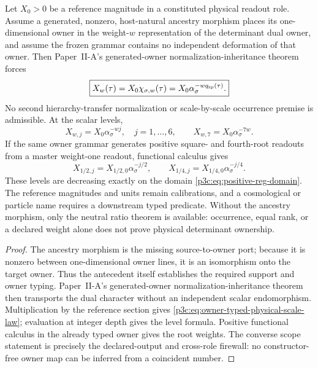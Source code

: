 \documentclass[12pt,a4paper]{article}
\begin{document}
\begin{corollary}
\label{p3c:cor:owner-typed-physical-dual-scale}
Let \(X_0>0\) be a reference magnitude in a constituted physical readout role.
Assume a generated, nonzero, host-natural ancestry morphism places its
one-dimensional owner in the weight-\(w\) representation of the determinant
dual owner, and assume the frozen grammar contains no independent deformation
of that owner.  Then Paper~II-A's generated-owner normalization-inheritance
theorem forces
\begin{equation}
\label{p3c:eq:owner-typed-physical-scale-law}
 \boxed{
 X_w(\tau)
 =X_0\chi_{\sigma,w}(\tau)
 =X_0\alpha_\sigma^{-wq_{\rm sp}(\tau)}.}
\end{equation}
No second hierarchy-transfer normalization or scale-by-scale occurrence
premise is admissible.  At the scalar levels,
\begin{equation}
\label{p3c:eq:owner-typed-physical-scale-levels}
 X_{w,j}=X_0\alpha_\sigma^{-wj},
 \quad j=1,\ldots,6,
 \qquad
 X_{w,7}=X_0\alpha_\sigma^{-7w}.
\end{equation}
If the same owner grammar generates positive square- and fourth-root readouts
from a master weight-one readout, functional calculus gives
\begin{equation}
\label{p3c:eq:root-weight-readouts}
 X_{1/2,j}=X_{1/2,0}\alpha_\sigma^{-j/2},
 \qquad
 X_{1/4,j}=X_{1/4,0}\alpha_\sigma^{-j/4}.
\end{equation}
These levels are decreasing exactly on the domain
\eqref{p3c:eq:positive-reg-domain}.  The reference magnitudes and units remain
calibrations, and a cosmological or particle name requires a downstream typed
predicate.  Without the ancestry morphism, only the neutral ratio theorem is
available: occurrence, equal rank, or a declared weight alone does not prove
physical determinant ownership.
\end{corollary}

\begin{proof}
The ancestry morphism is the missing source-to-owner port; because it is
nonzero between one-dimensional owner lines, it is an isomorphism onto the
target owner.  Thus the antecedent itself establishes the required support and
owner typing.  Paper~II-A's generated-owner normalization-inheritance theorem
then transports the dual character without an independent scalar endomorphism.
Multiplication by the reference section gives
\eqref{p3c:eq:owner-typed-physical-scale-law}; evaluation at integer depth
gives the level formula.  Positive functional calculus in the already typed
owner gives the root weights.  The converse scope statement is precisely the
declared-output and cross-role firewall: no constructor-free owner map can be
inferred from a coincident number.
\end{proof}
\end{document}
